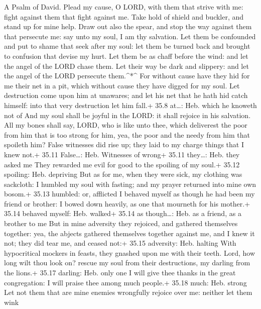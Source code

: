 A Psalm of David.  Plead my cause, O LORD, with them that
strive with me: fight against them that fight against me. 
Take hold of shield and buckler, and stand up for mine help.
 Draw out also the spear, and stop the way against them that
persecute me: say unto my soul, I am thy salvation.  Let
them be confounded and put to shame that seek after my soul: let them be
turned back and brought to confusion that devise my hurt. 
Let them be as chaff before the wind: and let the angel of the LORD
chase them.  Let their way be dark and slippery: and let the
angel of the LORD persecute them.\^{}*\^{}  For without
cause have they hid for me their net in a pit, which without cause they
have digged for my soul.  Let destruction come upon him at
unawares; and let his net that he hath hid catch himself: into that very
destruction let him fall.+ 35.8 at\ldots: Heb. which he knoweth not of
 And my soul shall be joyful in the LORD: it shall rejoice
in his salvation.  All my bones shall say, LORD, who is
like unto thee, which deliverest the poor from him that is too strong
for him, yea, the poor and the needy from him that spoileth him?
 False witnesses did rise up; they laid to my charge things
that I knew not.+ 35.11 False\ldots: Heb. Witnesses of wrong+ 35.11
they\ldots: Heb. they asked me  They rewarded me evil for
good to the spoiling of my soul.+ 35.12 spoiling: Heb. depriving
 But as for me, when they were sick, my clothing was
sackcloth: I humbled my soul with fasting; and my prayer returned into
mine own bosom.+ 35.13 humbled: or, afflicted  I behaved
myself as though he had been my friend or brother: I bowed down heavily,
as one that mourneth for his mother.+ 35.14 behaved myself: Heb. walked+
35.14 as though\ldots: Heb. as a friend, as a brother to me
 But in mine adversity they rejoiced, and gathered
themselves together: yea, the abjects gathered themselves together
against me, and I knew it not; they did tear me, and ceased not:+ 35.15
adversity: Heb. halting  With hypocritical mockers in
feasts, they gnashed upon me with their teeth.  Lord, how
long wilt thou look on? rescue my soul from their destructions, my
darling from the lions.+ 35.17 darling: Heb. only one  I
will give thee thanks in the great congregation: I will praise thee
among much people.+ 35.18 much: Heb. strong  Let not them
that are mine enemies wrongfully rejoice over me: neither let them wink
